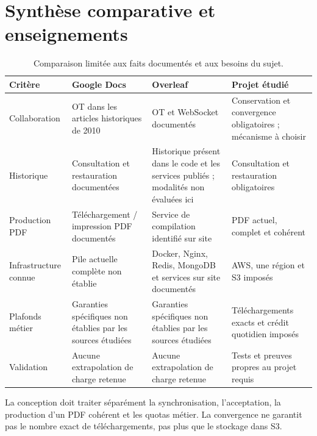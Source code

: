\section{Synthèse comparative et enseignements}
\begin{table}[H]\small
\begin{tabularx}{\linewidth}{@{}L{31mm}YYY@{}}\toprule
Critère & Google Docs & Overleaf & Projet étudié\\\midrule
Collaboration & OT dans les articles historiques de 2010 & OT et WebSocket documentés & Conservation et convergence obligatoires ; mécanisme à choisir\\
Historique & Consultation et restauration documentées & Historique présent dans le code et les services publiés ; modalités non évaluées ici & Consultation et restauration obligatoires\\
Production PDF & Téléchargement / impression PDF documentés & Service de compilation identifié sur site & PDF actuel, complet et cohérent\\
Infrastructure connue & Pile actuelle complète non établie & Docker, Nginx, Redis, MongoDB et services sur site documentés & AWS, une région et S3 imposés\\
Plafonds métier & Garanties spécifiques non établies par les sources étudiées & Garanties spécifiques non établies par les sources étudiées & Téléchargements exacts et crédit quotidien imposés\\
Validation & Aucune extrapolation de charge retenue & Aucune extrapolation de charge retenue & Tests et preuves propres au projet requis\\\bottomrule
\end{tabularx}
\caption{Comparaison limitée aux faits documentés et aux besoins du sujet.}
\end{table}

La conception doit traiter séparément la synchronisation, l'acceptation, la production d'un PDF cohérent et les quotas métier. La convergence ne garantit pas le nombre exact de téléchargements, pas plus que le stockage dans S3.


